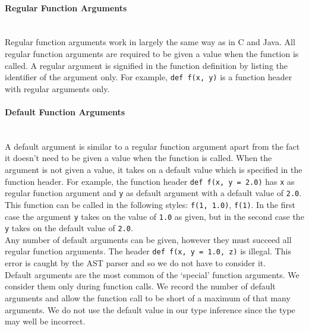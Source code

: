 \documentclass[12pt, titlepage]{article}
\begin{document}
\paragraph*{Regular Function Arguments}\mbox{} \\
Regular function arguments work in largely the same way as in C and Java. All regular function arguments are required to be given a value when the function is called. A regular argument is signified in the function definition by listing the identifier of the argument only. For example, \texttt{def f(x, y)} is a function header with regular arguments only.

\paragraph*{Default Function Arguments}\mbox{} \\
A default argument is similar to a regular function argument apart from the fact it doesn't need to be given a value when the function is called. When the argument is not given a value, it takes on a default value which is specified in the function header. For example, the function header \texttt{def f(x, y = 2.0)} has \texttt{x} as regular function argument and \texttt{y} as default argument with a default value of \texttt{2.0}. This function can be called in the following styles: \texttt{f(1, 1.0)}, \texttt{f(1)}. In the first case the argument \texttt{y} takes on the value of \texttt{1.0} as given, but in the second case the \texttt{y} takes on the default value of \texttt{2.0}. \\
\indent Any number of default arguments can be given, however they must succeed all regular function arguments. The header \texttt{def f(x, y = 1.0, z)} is illegal. This error is caught by the AST parser and so we do not have to consider it. \\
\indent Default arguments are the most common of the `special' function arguments. We consider them only during function calls. We record the number of default arguments and allow the function call to be short of a maximum of that many arguments. We do not use the default value in our type inference since the type may well be incorrect.
\end{document}
